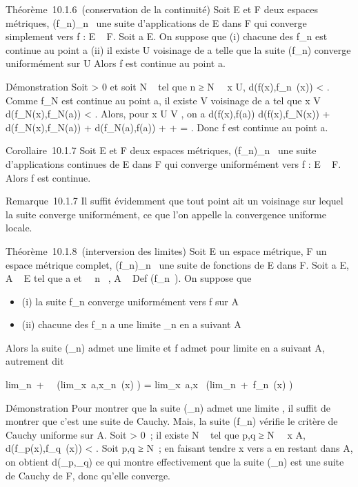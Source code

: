 \documentclass[]{article}
\begin{document}
Théorème~10.1.6~(conservation de la continuité) Soit E et F deux espaces
métriques, (f\_n)\_n\in{}~ une suite d'applications de E
dans F qui converge simplement vers f : E \rightarrow~ F. Soit a \in E. On suppose
que (i) chacune des f\_n est continue au point a (ii) il existe
U voisinage de a telle que la suite (f\_n) converge uniformément
sur U Alors f est continue au point a.

Démonstration Soit \epsilon \textgreater{} 0 et soit N \in {}~ tel que n ≥ N
\rigtharrow~\forall~x \in U, d(f(x),f\_n~(x)) \textless{}
\epsilon {} . Comme f\_N est continue au point a,
il existe V voisinage de a tel que x \in V \rigtharrow~
d(f\_N(x),f\_N(a)) \textless{} \epsilon {} . Alors, pour x \in U \bigcap V , on a d(f(x),f(a)) \leq
d(f(x),f\_N(x)) + d(f\_N(x),f\_N(a)) +
d(f\_N(a),f(a)) \leq \epsilon {} + \epsilon
{} + \epsilon {} = \epsilon. Donc f est
continue au point a.

Corollaire~10.1.7 Soit E et F deux espaces métriques,
(f\_n)\_n\in{}~ une suite d'applications continues de E dans
F qui converge uniformément vers f : E \rightarrow~ F. Alors f est continue.

Remarque~10.1.7 Il suffit évidemment que tout point ait un voisinage sur
lequel la suite converge uniformément, ce que l'on appelle la
convergence uniforme locale.

Théorème~10.1.8~(interversion des limites) Soit E un espace métrique, F
un espace métrique complet, (f\_n)\_n\in{}~ une suite de
fonctions de E dans F. Soit a \in E, A \subset~ E tel que a
\in\overlineA et \forall~~n \in {}~, A
\subset~ Def (f\_n~). On suppose que

\begin{itemize}
\itemsep1pt\parskip0pt
\item
  (i) la suite f\_n converge uniformément vers f sur A
\item
  (ii) chacune des f\_n a une limite \ell\_n en a suivant A
\end{itemize}

Alors la suite (\ell\_n) admet une limite \ell et f admet \ell pour
limite en a suivant A, autrement dit

lim\_n\rightarrow~+\infty~~\left
(lim\_x\rightarrow~a,x\inAf\_n~(x)\right
) = lim\_x\rightarrow~a,x\inA~\left
(lim\_n\rightarrow~+\infty~f\_n~(x)\right
)

Démonstration Pour montrer que la suite (\ell\_n) admet une limite
\ell, il suffit de montrer que c'est une suite de Cauchy. Mais, la suite
(f\_n) vérifie le critère de Cauchy uniforme sur A. Soit \epsilon
\textgreater{} 0~; il existe N \in {}~ tel que p,q ≥ N
\rigtharrow~\forall~x \in A, d(f\_p(x),f\_q~(x))
\textless{} \epsilon. Soit p,q ≥ N~; en faisant tendre x vers a en restant dans
A, on obtient d(\ell\_p,\ell\_q) \leq \epsilon ce qui montre
effectivement que la suite (\ell\_n) est une suite de Cauchy de F,
donc qu'elle converge.
\end{document}
